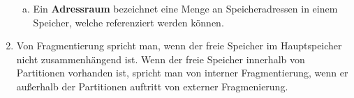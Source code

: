 \documentclass[numbers=noendperiod]{scrartcl}
\begin{document}
\begin{enumerate}[1.]
\begin{enumerate}[a)]
		\item Ein \textbf{Adressraum} bezeichnet eine Menge an Speicheradressen in einem Speicher, welche referenziert werden können.
	\end{enumerate}
	

	\item Von Fragmentierung spricht man, wenn der freie Speicher im Hauptspeicher nicht zusammenhängend ist. Wenn der freie Speicher innerhalb von Partitionen vorhanden ist, spricht man von interner Fragmentierung, wenn er außerhalb der Partitionen auftritt von externer Fragmenierung. 

			 
				

\end{enumerate}
\end{document}
